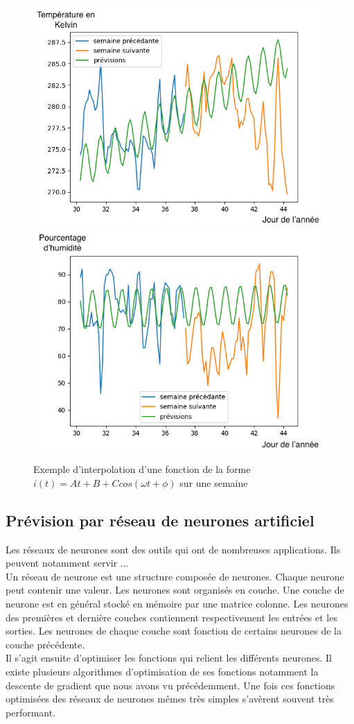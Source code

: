 \documentclass[11pt,a4paper]{article}
\begin{document}
\begin{figure} [H]
\centering
\includegraphics[width=0.48 \textwidth]{./imagesTIPE/cosDS.png}\quad
\includegraphics[width=0.48 \textwidth]{./imagesTIPE/cosDSH.png}
\caption{\label{fig:cosDS} Exemple d'interpolation d'une fonction de la forme $i(t) = At +B + C cos (\omega t + \phi)$ sur une semaine}
\end{figure}





\subsection {Prévision par réseau de neurones artificiel}
Les réseaux de neurones sont des outils qui ont de nombreuses applications. Ils peuvent notamment servir ... \\
Un réseau de neurone est une structure composée de neurones. Chaque neurone peut contenir une valeur. Les neurones sont organisés en couche. Une couche de neurone est en général stocké en mémoire par une matrice colonne. Les neurones des premières et dernière couches contiennent respectivement les entrées et les sorties. Les neurones de chaque couche sont fonction de certains neurones de la couche précédente. \\
Il s'agit ensuite d'optimiser les fonctions qui relient les différents neurones. Il existe plusieurs algorithmes d'optimisation de ses fonctions notamment la descente de gradient que nous avons vu précédemment. Une fois ces fonctions optimisées des réseaux de neurones mêmes très simples s'avèrent souvent très performant. \\
\end{document}
